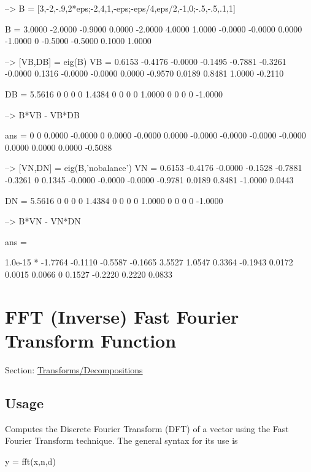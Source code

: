 \begin{DoxyVerbInclude}
--> B = [3,-2,-.9,2*eps;-2,4,1,-eps;-eps/4,eps/2,-1,0;-.5,-.5,.1,1]

B = 
    3.0000   -2.0000   -0.9000    0.0000 
   -2.0000    4.0000    1.0000   -0.0000 
   -0.0000    0.0000   -1.0000         0 
   -0.5000   -0.5000    0.1000    1.0000 

--> [VB,DB] = eig(B)
VB = 
    0.6153   -0.4176   -0.0000   -0.1495 
   -0.7881   -0.3261   -0.0000    0.1316 
   -0.0000   -0.0000    0.0000   -0.9570 
    0.0189    0.8481    1.0000   -0.2110 

DB = 
    5.5616         0         0         0 
         0    1.4384         0         0 
         0         0    1.0000         0 
         0         0         0   -1.0000 

--> B*VB - VB*DB

ans = 
         0         0    0.0000   -0.0000 
         0    0.0000   -0.0000    0.0000 
   -0.0000   -0.0000   -0.0000   -0.0000 
    0.0000    0.0000    0.0000   -0.5088 

--> [VN,DN] = eig(B,'nobalance')
VN = 
    0.6153   -0.4176   -0.0000   -0.1528 
   -0.7881   -0.3261         0    0.1345 
   -0.0000   -0.0000   -0.0000   -0.9781 
    0.0189    0.8481   -1.0000    0.0443 

DN = 
    5.5616         0         0         0 
         0    1.4384         0         0 
         0         0    1.0000         0 
         0         0         0   -1.0000 

--> B*VN - VN*DN

ans = 

   1.0e-15 * 
   -1.7764   -0.1110   -0.5587   -0.1665 
    3.5527    1.0547    0.3364   -0.1943 
    0.0172    0.0015    0.0066         0 
    0.1527   -0.2220    0.2220    0.0833 
\end{DoxyVerbInclude}
 \hypertarget{transforms_fft}{}\section{F\-F\-T (Inverse) Fast Fourier Transform Function}\label{transforms_fft}
Section\-: \hyperlink{sec_transforms}{Transforms/\-Decompositions} \hypertarget{vtkwidgets_vtkxyplotwidget_Usage}{}\subsection{Usage}\label{vtkwidgets_vtkxyplotwidget_Usage}
Computes the Discrete Fourier Transform (D\-F\-T) of a vector using the Fast Fourier Transform technique. The general syntax for its use is \begin{DoxyVerb}  y = fft(x,n,d)
\end{DoxyVerb}
